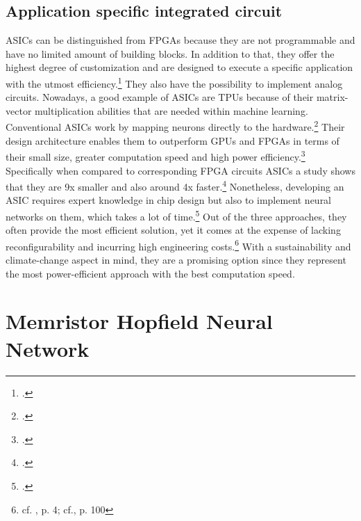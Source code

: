 \subsection{Application specific integrated circuit}
\ac{ASIC}s can be distinguished from \ac{FPGA}s because they are not programmable and have no limited amount of building blocks. 
In addition to that, they offer the highest degree of customization and are designed to execute a specific application with the utmost efficiency.\footcite[cf.][17]{baischerLearningHardwareTutorial2021}
They also have the possibility to implement analog circuits.
Nowadays, a good example of \ac{ASIC}s are \ac{TPU}s because of their matrix-vector multiplication abilities that are needed within machine learning.
Conventional \ac{ASIC}s work by mapping neurons directly to the hardware.\footcite[cf.][104]{huSurveyConvolutionalNeural2022}
Their design architecture enables them to outperform \ac{GPU}s and \ac{FPGA}s in terms of their small size, greater computation speed and high power efficiency.\footcite[cf.][17]{baischerLearningHardwareTutorial2021}
Specifically when compared to corresponding \ac{FPGA} circuits \ac{ASIC}s a study shows that they are 9x smaller and also around 4x faster.\footcite[cf.][5]{boutrosFPGAArchitecturePrinciples2021}
Nonetheless, developing an \ac{ASIC} requires expert knowledge in chip design but also to implement neural networks on them, which takes a lot of time.\footcite[cf.][17]{baischerLearningHardwareTutorial2021}
Out of the three approaches, they often provide the most efficient solution, yet it comes at the expense of lacking reconfigurability and incurring high engineering costs.\footnote{cf. \cite{peccerilloSurveyHardwareAccelerators2022}, p. 4; cf.\cite{huSurveyConvolutionalNeural2022}, p. 100}
With a sustainability and climate-change aspect in mind, they are a promising option since they represent the most power-efficient approach with the best computation speed.


\section{Memristor Hopfield Neural Network}

